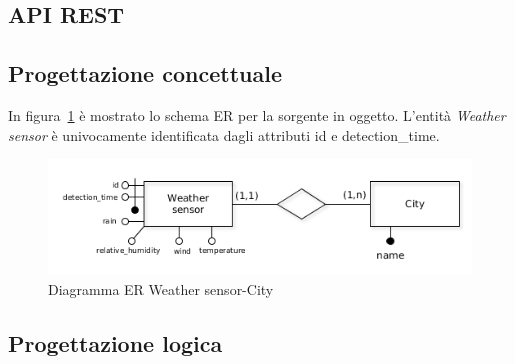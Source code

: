 \subsection{API REST}

\subsection{Progettazione concettuale}

In figura~\ref{fig:weather_detection_er} è mostrato lo schema ER per la sorgente in oggetto.
L'entità \textit{Weather sensor} è univocamente identificata dagli attributi id e detection\_time.

\begin{figure}[H]                                                                                                                                                            
\centering                                                                                                                                                                   
\includegraphics[width=\textwidth]{diagrams/weather_detection_er}                                                                                                                                   
\caption{Diagramma ER Weather sensor-City}                                                                                                                                            
\label{fig:weather_detection_er}                                                                                                                                                           
\end{figure}

\subsection{Progettazione logica}

